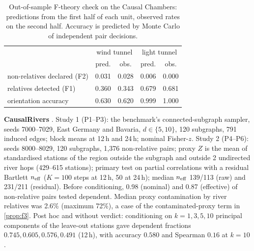 \begin{table}[h]
\caption{Out-of-sample F-theory check on the Causal Chambers: predictions
from the first half of each unit, observed rates on the second half.
Accuracy is predicted by Monte Carlo of independent pair decisions.}
\label{tab:ftheory}
\vskip -0.05in
\centering\small
\setlength{\tabcolsep}{4pt}
\begin{tabular}{lcccc}
\toprule
 & \multicolumn{2}{c}{wind tunnel} & \multicolumn{2}{c}{light tunnel} \\
 & pred. & obs. & pred. & obs. \\
\midrule
non-relatives declared (F2) & 0.031 & 0.028 & 0.006 & 0.000 \\
relatives detected (F1) & 0.360 & 0.343 & 0.679 & 0.681 \\
orientation accuracy & 0.630 & 0.620 & 0.999 & 1.000 \\
\bottomrule
\end{tabular}
\vskip -0.1in
\end{table}

\textbf{CausalRivers} \citep{stein2025causalrivers}. Study 1 (P1--P3): the
benchmark's connected-subgraph sampler, seeds 7000--7029, East Germany and
Bavaria, $d\in\{5,10\}$, 120 subgraphs, 791 induced edges; block means at
12\,h and 24\,h; nominal Fisher-$z$. Study 2 (P4--P6): seeds 8000--8029, 120
subgraphs, 1{,}376 non-relative pairs; proxy $Z$ is the mean of standardised
stations of the region outside the subgraph and outside 2 undirected river
hops (429--615 stations); primary test on partial correlations with a residual
Bartlett $n_{\mathrm{eff}}$ ($K=100$ steps at 12\,h, 50 at 24\,h); median $n_{\mathrm{eff}}$ 139/113
(raw) and 231/211 (residual). Before conditioning, 0.98 (nominal) and 0.87
(effective) of non-relative pairs tested dependent. Median proxy
contamination by river relatives was 2.6\% (maximum 72\%), a case of the
contaminated-proxy term in \cref{prop:f3}. Post hoc and without verdict:
conditioning on $k=1,3,5,10$ principal components of the leave-out stations
gave dependent fractions $0.745,0.605,0.576,0.491$ (12\,h), with accuracy
$0.580$ and Spearman $0.16$ at $k=10$.

